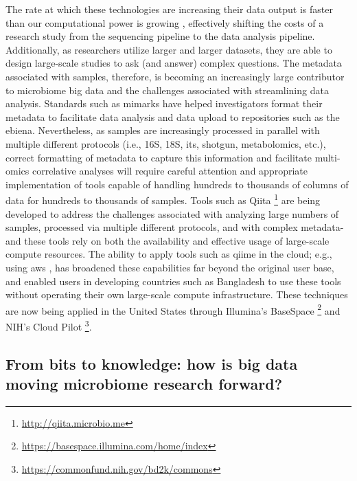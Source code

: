 The rate at which these technologies are increasing their data output is faster
than our computational power is growing \cite{Wetterstrand2013}, effectively
shifting the costs of a research study from the sequencing pipeline to the data
analysis pipeline. Additionally, as researchers utilize larger and larger datasets,
they are able to design large-scale studies to ask (and answer) complex questions.
The metadata associated with samples, therefore, is becoming an increasingly large
contributor to microbiome big data and the challenges associated with streamlining
data analysis. Standards such as \gls{mimarks} \cite{Yilmaz2011} have helped
investigators format their metadata to facilitate data analysis and data upload to
repositories such as the \gls{ebiena}. Nevertheless, as samples are increasingly
processed in parallel with multiple different protocols (i.e., 16S, 18S, \gls{its},
shotgun, metabolomics, etc.), correct formatting of metadata to capture this
information and facilitate multi-omics correlative analyses will require careful
attention and appropriate implementation of tools capable of handling hundreds to
thousands of columns of data for hundreds to thousands of samples. Tools such as
Qiita \footnote{\label{qiitaurl}\url{http://qiita.microbio.me}} are being
developed to address the challenges associated with analyzing large numbers of
samples, processed via multiple different protocols, and with complex metadata-and
these tools rely on both the availability and effective usage of large-scale compute
resources. The ability to apply tools such as \gls{qiime} in the cloud; e.g., using
\gls{aws} \cite{Ragan-Kelley2013}, has broadened these capabilities far beyond the
original user base, and enabled users in developing countries such as Bangladesh to
use these tools without operating their own large-scale compute infrastructure.
These techniques are now being applied in the United States through Illumina's
BaseSpace \footnote{\label{basespaceurl}\url{https://basespace.illumina.com/home/index}}
and NIH's Cloud Pilot \footnote{\label{cloudpiloturl}\url{https://commonfund.nih.gov/bd2k/commons}}.

\subsection{From bits to knowledge: how is big data moving microbiome research forward?}

